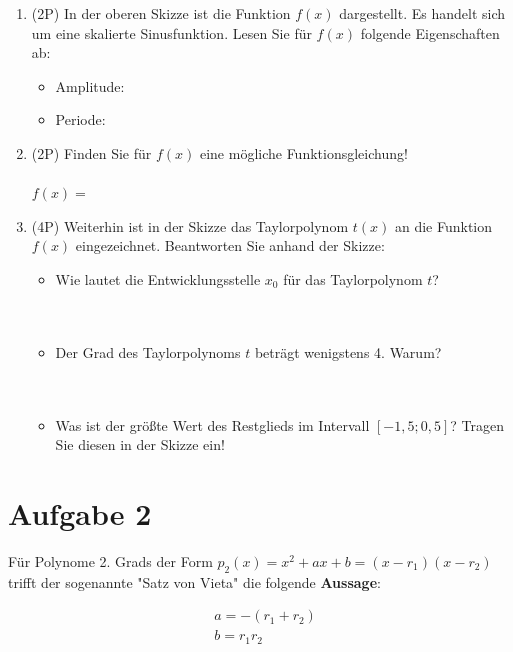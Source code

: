 \documentclass[12pt]{article}
\begin{document}
\begin{enumerate}[label=(\alph*)]
\item (2P) In der oberen Skizze ist die Funktion $f(x)$ dargestellt. Es handelt sich um eine skalierte Sinusfunktion. Lesen Sie für $f(x)$ folgende Eigenschaften ab:
\begin{itemize}
\item Amplitude:
\item Periode:

\end{itemize}
\item (2P) Finden Sie für $f(x)$ eine mögliche Funktionsgleichung! \\
\\
$f(x)=$
\\

\item (4P) Weiterhin ist in der Skizze das Taylorpolynom $t(x)$ an die Funktion $f(x)$  eingezeichnet. Beantworten Sie anhand der Skizze:
\begin{itemize}
\item Wie lautet die Entwicklungsstelle $x_0$ für das Taylorpolynom $t$? \\
\\
\\

\item Der Grad des Taylorpolynoms $t$ beträgt wenigstens 4. Warum?\\
\\
\\

\item Was ist der größte Wert des Restglieds im Intervall $[-1{,}5;0{,}5]$? Tragen Sie diesen in der Skizze ein!
\end{itemize}
\end {enumerate}

\newpage
\section* {Aufgabe 2}

Für Polynome 2. Grads der Form $p_2(x)=x^2+ax+b = (x-r_1)(x-r_2)$ trifft der sogenannte "Satz von Vieta" die folgende \textbf{Aussage}:

\begin{align*}
&a = -(r_1+r_2)\\
&b= r_1r_2\\
\end{align*}
\end{document}
